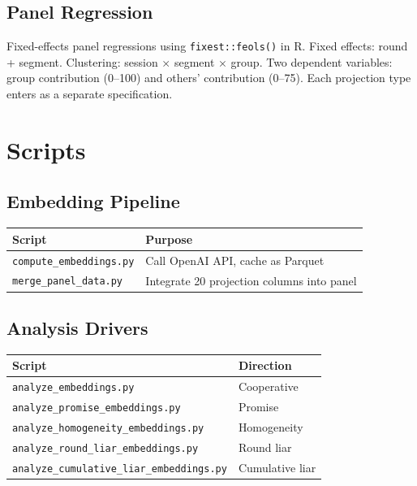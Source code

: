 \documentclass[11pt,oneside]{article}
\begin{document}
\subsection{Panel Regression}

Fixed-effects panel regressions using \texttt{fixest::feols()} in R. Fixed effects: round + segment. Clustering: session $\times$ segment $\times$ group. Two dependent variables: group contribution (0--100) and others' contribution (0--75). Each projection type enters as a separate specification.

\section{Scripts}

\subsection{Embedding Pipeline}

\begin{tabular}{ll}
\toprule
Script & Purpose \\
\midrule
\texttt{compute\_embeddings.py} & Call OpenAI API, cache as Parquet \\
\texttt{merge\_panel\_data.py} & Integrate 20 projection columns into panel \\
\bottomrule
\end{tabular}

\subsection{Analysis Drivers}

\begin{tabular}{ll}
\toprule
Script & Direction \\
\midrule
\texttt{analyze\_embeddings.py} & Cooperative \\
\texttt{analyze\_promise\_embeddings.py} & Promise \\
\texttt{analyze\_homogeneity\_embeddings.py} & Homogeneity \\
\texttt{analyze\_round\_liar\_embeddings.py} & Round liar \\
\texttt{analyze\_cumulative\_liar\_embeddings.py} & Cumulative liar \\
\bottomrule
\end{tabular}
\end{document}
